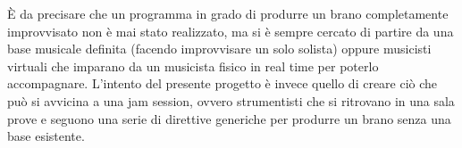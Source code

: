 È da precisare che un programma in grado di produrre un brano completamente improvvisato non è mai stato realizzato, ma si è sempre cercato di partire da una base musicale definita (facendo improvvisare un solo solista) oppure musicisti virtuali che imparano da un musicista fisico in real time per poterlo accompagnare.
L'intento del presente progetto è invece quello di creare ciò che può si avvicina a una jam session, ovvero strumentisti che si ritrovano in una sala prove e seguono una serie di direttive generiche per produrre un brano senza una base esistente.
